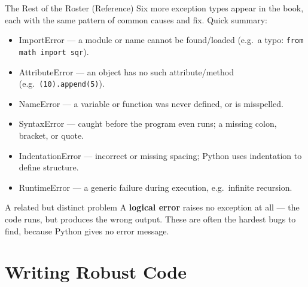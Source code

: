 \documentclass[9pt,aspectratio=169,xcolor=table]{beamer}
\begin{document}
\begin{frame}{The Rest of the Roster (Reference)}
    \leavevmode
    \small
    Six more exception types appear in the book, each with the same
    pattern of common causes and fix. Quick summary:

    \vspace{2mm}
    \begin{itemize}\scriptsize
        \item \alert{ImportError} --- a module or name cannot be found/loaded
              (e.g.\ a typo: \texttt{from math import sqr}).
        \item \alert{AttributeError} --- an object has no such
              attribute/method (e.g.\ \texttt{(10).append(5)}).
        \item \alert{NameError} --- a variable or function was never
              defined, or is misspelled.
        \item \alert{SyntaxError} --- caught before the program even
              runs; a missing colon, bracket, or quote.
        \item \alert{IndentationError} --- incorrect or missing
              spacing; Python uses indentation to define structure.
        \item \alert{RuntimeError} --- a generic failure during
              execution, e.g.\ infinite recursion.
    \end{itemize}

    \vspace{2mm}
    \begin{alertblock}{A related but distinct problem}
        A \textbf{logical error} raises no exception at all --- the
        code runs, but produces the \alert{wrong} output. These are
        often the hardest bugs to find, because Python gives no error
        message.
    \end{alertblock}
\end{frame}

\section{Writing Robust Code}
\end{document}
